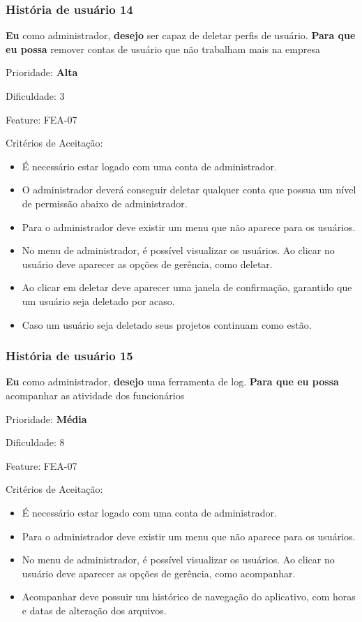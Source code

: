   \subsubsection{História de usuário 14}
    \textbf{Eu} como administrador, \textbf{desejo} ser capaz de deletar perfis de usuário. \textbf{Para que eu possa} remover contas de usuário que não trabalham mais na empresa

    Prioridade: \textbf{Alta}

    Dificuldade: 3

    Feature: FEA-07

    Critérios de Aceitação:
    \begin{itemize}
      \item É necessário estar logado com uma conta de administrador. 
      \item O administrador deverá conseguir deletar qualquer conta que possua um nível de permissão abaixo de administrador.
      \item Para o administrador deve existir um menu que não aparece para os usuários.
      \item No menu de administrador, é possível visualizar os usuários. Ao clicar no usuário deve aparecer as opções de gerência, como deletar.
      \item Ao clicar em deletar deve aparecer uma janela de confirmação, garantido que um usuário seja deletado por acaso.
      \item Caso um usuário seja deletado seus projetos continuam como estão.
    \end{itemize}

  \subsubsection{História de usuário 15}
    \textbf{Eu} como administrador, \textbf{desejo} uma ferramenta de log. \textbf{Para que eu possa} acompanhar as atividade dos funcionários

    Prioridade: \textbf{Média}

    Dificuldade: 8

    Feature: FEA-07

    Critérios de Aceitação:
    \begin{itemize}
      \item É necessário estar logado com uma conta de administrador. 
      \item Para o administrador deve existir um menu que não aparece para os usuários.
      \item No menu de administrador, é possível visualizar os usuários. Ao clicar no usuário deve aparecer as opções de gerência, como acompanhar.
      \item Acompanhar deve possuir um histórico de navegação do aplicativo, com horas e datas de alteração dos arquivos.
    \end{itemize}

